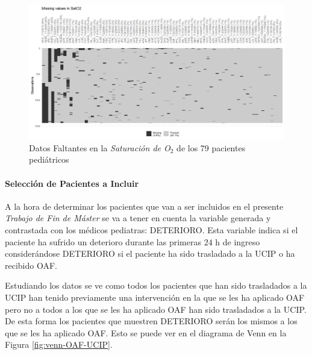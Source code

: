 \newpage
\thispagestyle{empty}

\begin{landscape}

    \begin{figure}[H]
        \centering
        \includegraphics[scale = 0.9]{./img/missing-data-SatO2.png}
        \caption{Datos Faltantes en la \textit{Saturación de O$_2$} de los 79 pacientes pediátricos}
        \label{fig:missing-SatO2}
    \end{figure}
    
\end{landscape}
\restoregeometry 

\paragraph{Selección de Pacientes a Incluir}\label{sec:seleccion_pacientes}

 A la hora de determinar los pacientes que van a ser incluidos en el presente \textit{Trabajo de Fin de Máster} se va a tener en cuenta la variable generada y contrastada con los médicos pediatras: DETERIORO. Esta variable indica si el paciente ha sufrido un deterioro durante las primeras $24$ h de ingreso considerándose DETERIORO si el paciente ha sido trasladado a la UCIP o ha recibido OAF. 

 Estudiando los datos se ve como todos los pacientes que han sido trasladados a la UCIP han tenido previamente una intervención en la que se les ha aplicado OAF pero no a todos a los que se les ha aplicado OAF han sido trasladados a la UCIP. De esta forma los pacientes que muestren DETERIORO serán los mismos a los que se les ha aplicado OAF. Esto se puede ver en el diagrama de Venn en la Figura \ref{fig:venn-OAF-UCIP}.

